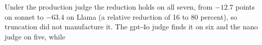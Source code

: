 Under the production judge the reduction holds on all seven, from $-12.7$
points on sonnet to $-63.4$ on Llama (a relative reduction of 16 to 80
percent), so truncation did not manufacture it. The gpt-4o judge finds it on
six and the nano judge on five, while
